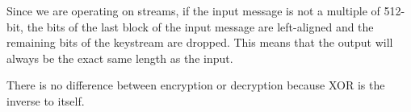 Since we are operating on streams, if the input message is not a multiple of 512-bit, the bits of the last block of the input message are left-aligned and the remaining bits of the keystream are dropped. This means that the output will always be the exact same length as the input.

There is no difference between encryption or decryption because XOR is the inverse to itself.
